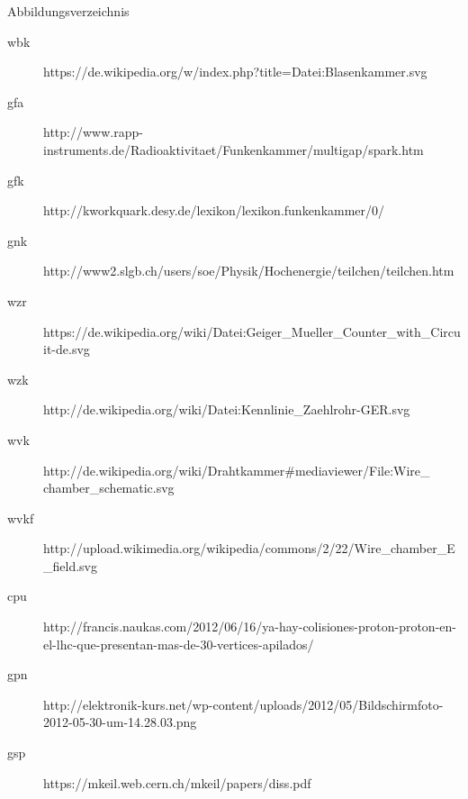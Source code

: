 \documentclass{beamer}
\begin{document}

\begin{frame}{Abbildungsverzeichnis}
\footnotesize
	\begin{adjustwidth}{-5em}{-2em}
	  	\begin{description}
		  	\item[wbk]
		  	https://de.wikipedia.org/w/index.php?title=Datei:Blasenkammer.svg
		  	\item[gfa]
		  	http://www.rapp-instruments.de/Radioaktivitaet/Funkenkammer/multigap/spark.htm
		  	\item[gfk]
		  	http://kworkquark.desy.de/lexikon/lexikon.funkenkammer/0/
		  	\item[gnk]
		  	http://www2.slgb.ch/users/soe/Physik/Hochenergie/teilchen/teilchen.htm
		  	\item[wzr]
		  	https://de.wikipedia.org/wiki/Datei:Geiger\_Mueller\_Counter\_with\_Circuit-de.svg
		  	\item[wzk]
			http://de.wikipedia.org/wiki/Datei:Kennlinie\_Zaehlrohr-GER.svg
			\item[wvk]
		  	http://de.wikipedia.org/wiki/Drahtkammer\#mediaviewer/File:Wire\_ chamber\_schematic.svg
		  	\item[wvkf]
		  	http://upload.wikimedia.org/wikipedia/commons/2/22/Wire\_chamber\_E\_field.svg
		  	\item[cpu]
		  	http://francis.naukas.com/2012/06/16/ya-hay-colisiones-proton-proton-en-el-lhc-que-presentan-mas-de-30-vertices-apilados/
		  	\item[gpn]
		  	http://elektronik-kurs.net/wp-content/uploads/2012/05/Bildschirmfoto-2012-05-30-um-14.28.03.png
		  	\item[gsp]
		  	https://mkeil.web.cern.ch/mkeil/papers/diss.pdf
		\end{description}
	\end{adjustwidth}  
\end{frame}
\end{document}
